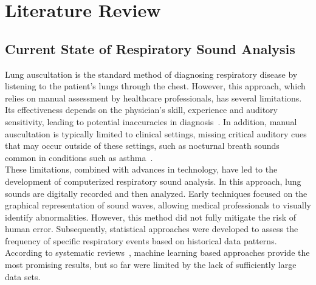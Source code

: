 \cleardoubleoddpage%
\chapter{Literature Review}

\section{Current State of Respiratory Sound Analysis}
Lung auscultation is the standard method of diagnosing respiratory disease by listening to the patient's lungs through the chest. However, this approach, which relies on manual assessment by healthcare professionals, has several limitations. Its effectiveness depends on the physician's skill, experience and auditory sensitivity, leading to potential inaccuracies in diagnosis~\cite{palaniappan2013computer}. In addition, manual auscultation is typically limited to clinical settings, missing critical auditory cues that may occur outside of these settings, such as nocturnal breath sounds common in conditions such as asthma~\cite{pramono2017automatic}. \\
These limitations, combined with advances in technology, have led to the development of computerized respiratory sound analysis. In this approach, lung sounds are digitally recorded and then analyzed. Early techniques focused on the graphical representation of sound waves, allowing medical professionals to visually identify abnormalities. However, this method did not fully mitigate the risk of human error. Subsequently, statistical approaches were developed to assess the frequency of specific respiratory events based on historical data patterns. According to systematic reviews~\cite{palaniappan2013computer}, machine learning based approaches provide the most promising results, but so far were limited by the lack of sufficiently large data sets.

